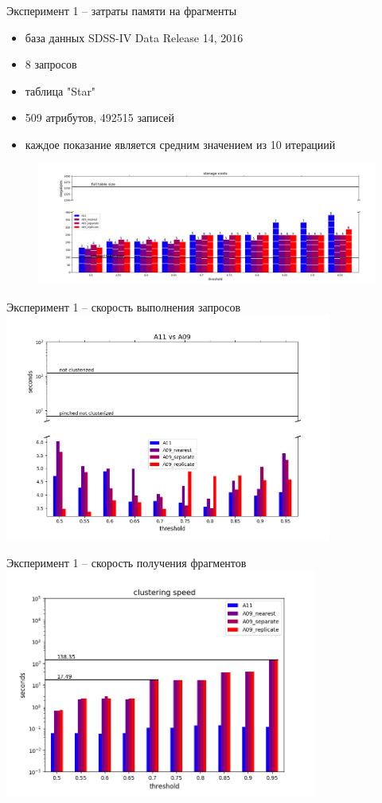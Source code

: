 \documentclass[10pt, dvipsnames]{beamer}
\begin{document}
\begin{frame}{Эксперимент 1 -- затраты памяти на фрагменты}
	\begin{itemize}
	\item база данных SDSS-IV Data Release 14, 2016
	\item 8 запросов
	\item таблица "Star"
	\item 509 атрибутов, 492515 записей
	\item каждое показание является средним значением из 10 итерациий
	\end{itemize}
	\begin{figure}[t]
\includegraphics[width=\textwidth]{./images/A11-vs-A09-tables-size.png}
	\end{figure}
\end{frame}

\begin{frame}{Эксперимент 1 -- скорость выполнения запросов}
\includegraphics[width=\textwidth, height=7.5cm]{./images/A11-vs-A09-bars.png}
\end{frame}

\begin{frame}{Эксперимент 1 -- скорость получения фрагментов}
\includegraphics[width=\textwidth, height=7.5cm]{./images/clustering-speed.png}
\end{frame}
\end{document}
